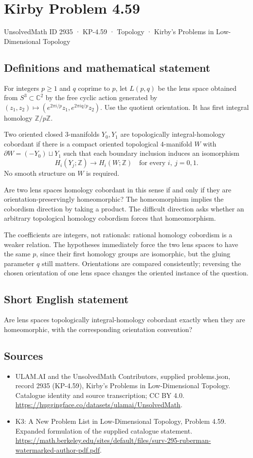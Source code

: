 \documentclass[11pt,a4paper]{article}
\begin{document}
\section*{Kirby Problem 4.59}\label{2935}
{\small UnsolvedMath ID 2935 · KP-4.59 · Topology · Kirby's Problems in Low-Dimensional Topology}
\subsection{Definitions and mathematical statement}
For integers $p\ge1$ and $q$ coprime to $p$, let $L(p,q)$ be the
lens space obtained from $S^3\subset\mathbb C^2$ by the free cyclic
action generated by
$(z_1,z_2)\mapsto(e^{2\pi i/p}z_1,e^{2\pi iq/p}z_2)$.
Use the quotient orientation. It has first integral homology
$\mathbb Z/p\mathbb Z$.

Two oriented closed $3$-manifolds $Y_0,Y_1$ are topologically
integral-homology cobordant if there is a compact oriented topological
$4$-manifold $W$ with $\partial W=(-Y_0)\sqcup Y_1$ such that
each boundary inclusion induces an isomorphism
\[
 H_i(Y_j;\mathbb Z)\longrightarrow H_i(W;\mathbb Z)
          \quad\text{for every }i,\ j=0,1.
\]
No smooth structure on $W$ is required.

Are two lens spaces homology cobordant in this sense if and only
if they are orientation-preservingly homeomorphic? The homeomorphism
implies the cobordism direction by taking a product. The difficult
direction asks whether an arbitrary topological homology cobordism
forces that homeomorphism.

The coefficients are integers, not rationals: rational homology
cobordism is a weaker relation. The hypotheses immediately force the
two lens spaces to have the same $p$, since their first homology
groups are isomorphic, but the gluing parameter $q$ still matters.
Orientations are compared consistently; reversing the chosen orientation
of one lens space changes the oriented instance of the question.
\subsection{Short English statement}
Are lens spaces topologically integral-homology cobordant exactly when they are homeomorphic, with the corresponding orientation convention?
\subsection{Sources}
\begin{itemize}
\item[S1] ULAM.AI and the UnsolvedMath Contributors, supplied problems.json, record 2935 (KP-4.59), Kirby's Problems in Low-Dimensional Topology. Catalogue identity and source transcription; CC BY 4.0.
\url{https://huggingface.co/datasets/ulamai/UnsolvedMath}.
\item[S2] K3: A New Problem List in Low-Dimensional Topology, Problem 4.59. Expanded formulation of the supplied catalogue statement.
\url{https://math.berkeley.edu/sites/default/files/surv-295-ruberman-watermarked-author-pdf.pdf}.
\end{itemize}
\end{document}
